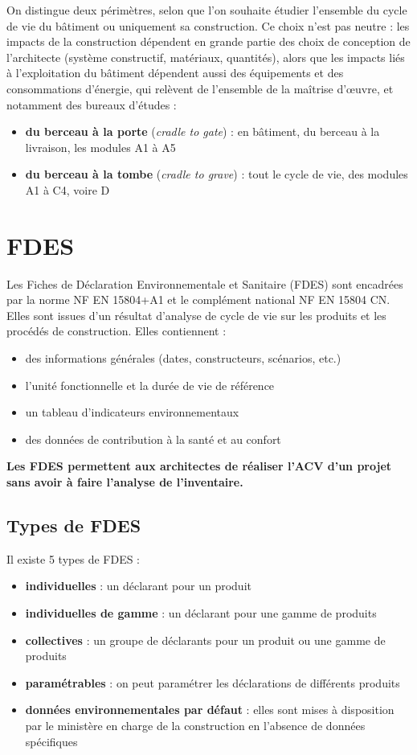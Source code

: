 On distingue deux périmètres, selon que l'on souhaite étudier l'ensemble du cycle de vie du bâtiment ou uniquement sa construction. Ce choix n'est pas neutre : les impacts de la construction dépendent en grande partie des choix de conception de l'architecte (système constructif, matériaux, quantités), alors que les impacts liés à l'exploitation du bâtiment dépendent aussi des équipements et des consommations d'énergie, qui relèvent de l'ensemble de la maîtrise d'œuvre, et notamment des bureaux d'études :
\begin{itemize}
  \item \textbf{du berceau à la porte} (\textit{cradle to gate}) : en bâtiment, du berceau à la livraison, les modules A1 à A5
  \item \textbf{du berceau à la tombe} (\textit{cradle to grave}) : tout le cycle de vie, des modules A1 à C4, voire D
\end{itemize}


\section{FDES}

Les Fiches de Déclaration Environnementale et Sanitaire (FDES) sont encadrées par la norme NF EN 15804+A1 et le complément national NF EN 15804 CN. Elles sont issues d'un résultat d'analyse de cycle de vie sur les produits et les procédés de construction. Elles contiennent :
\begin{itemize}
  \item des informations générales (dates, constructeurs, scénarios, etc.)
  \item l'unité fonctionnelle et la durée de vie de référence
  \item un tableau d'indicateurs environnementaux
  \item des données de contribution à la santé et au confort
\end{itemize}

\textbf{Les FDES permettent aux architectes de réaliser l'ACV d'un projet sans avoir à faire l'analyse de l'inventaire.}

\subsection*{Types de FDES}

Il existe 5 types de FDES :
\begin{itemize}
  \item \textbf{individuelles} : un déclarant pour un produit
  \item \textbf{individuelles de gamme} : un déclarant pour une gamme de produits
  \item \textbf{collectives} : un groupe de déclarants pour un produit ou une gamme de produits
  \item \textbf{paramétrables} : on peut paramétrer les déclarations de différents produits
  \item \textbf{données environnementales par défaut} : elles sont mises à disposition par le ministère en charge de la construction en l'absence de données spécifiques
\end{itemize}

